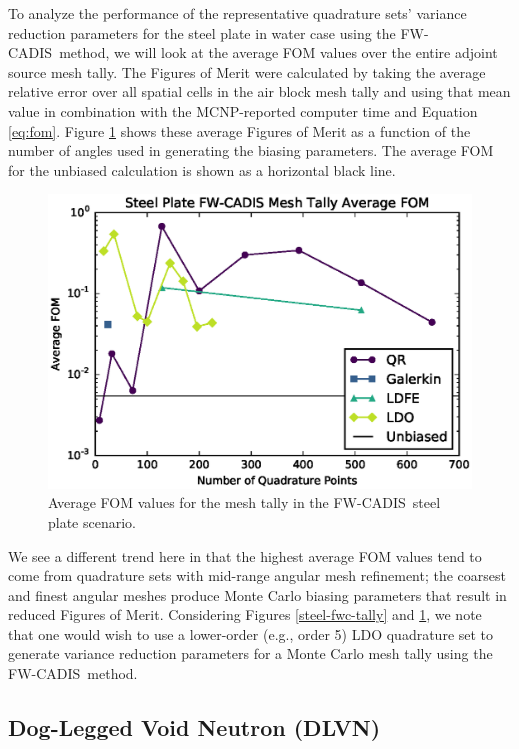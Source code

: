 \documentclass{article} %
\newcommand{\fwc}{\mbox{FW-CADIS}}
\begin{document}
To analyze the performance of the representative quadrature sets' variance
reduction parameters for the steel plate in water case using the \fwc\ method,
we will look at the average FOM values over the entire adjoint source mesh
tally. The Figures of Merit were calculated by taking the average relative
error over all spatial cells in the air block mesh tally and using that mean
value in combination with the MCNP-reported computer time and Equation
\ref{eq:fom}. Figure \ref{steel-fwc-fom} shows these average Figures of Merit
as a function of the number of angles used in generating the biasing
parameters. The average FOM for the unbiased calculation is shown as a
horizontal black line.

\begin{figure}[!htb]
\centering
\includegraphics[max height=0.445\textheight]{img/steel-fwcadis-fom.eps}
\caption{Average FOM values for the mesh tally in the \fwc\ steel plate scenario.}
\label{steel-fwc-fom}
\end{figure}

We see a different trend here in that the highest average FOM values tend to
come from quadrature sets with mid-range angular mesh refinement; the coarsest
and finest angular meshes produce Monte Carlo biasing parameters that result
in reduced Figures of Merit. Considering Figures \ref{steel-fwc-tally} and
\ref{steel-fwc-fom}, we note that one would wish to use a lower-order (e.g.,
order 5) LDO quadrature set to generate variance reduction parameters for a
Monte Carlo mesh tally using the \fwc\ method.

\FloatBarrier
\subsection{Dog-Legged Void Neutron (DLVN)}
\end{document}
